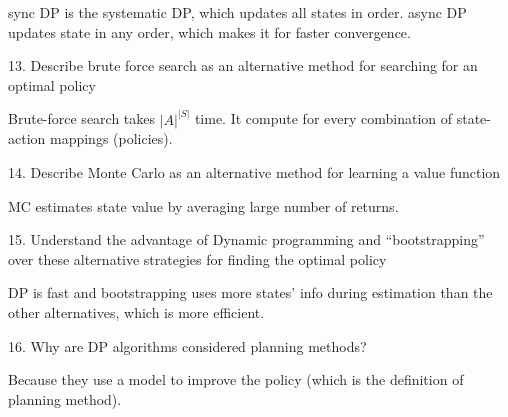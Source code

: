 \documentclass[sutton_barto_notes.tex]{subfiles}
\begin{document}
sync DP is the systematic DP, which updates all states in order. async DP updates state in any order, which makes it for faster convergence.

13. Describe brute force search as an alternative method for searching for an optimal policy

Brute-force search takes $|A|^{|S|}$ time. It compute for every combination of state-action mappings (policies).

14. Describe Monte Carlo as an alternative method for learning a value function

MC estimates state value by averaging large number of returns.

15. Understand the advantage of Dynamic programming and “bootstrapping” over these alternative strategies for finding the optimal policy

DP is fast and bootstrapping uses more states' info during estimation than the other alternatives, which is more efficient.

16. Why are DP algorithms considered planning methods?

Because they use a model to improve the policy (which is the definition of planning method).
\end{document}
